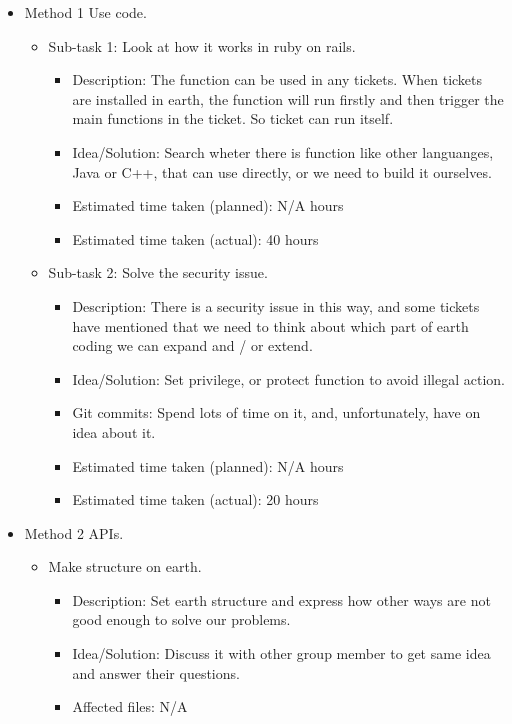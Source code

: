 \begin{itemize}
	\item Method 1 Use code.
	     \begin{itemize}
	        \item Sub-task 1: Look at how it works in ruby on rails.
	           \begin{itemize}
					\item Description: The function can be used in any tickets. When tickets are installed in earth, the function will run firstly and then trigger the main functions in the ticket. So ticket can run itself.
					\item Idea/Solution: Search wheter there is function like other languanges, Java or C++, that can use directly, or we need to build it ourselves. 
					\item Estimated time taken (planned): N/A hours
					\item Estimated time taken (actual): 40 hours
				\end{itemize}
			\item Sub-task 2: Solve the security issue.
			   \begin{itemize}
					\item Description: There is a security issue in this way, and some tickets have mentioned that we need to think about which part of earth coding we can expand and / or extend. 
					\item Idea/Solution: Set privilege, or protect function to avoid illegal action.
					\item Git commits: Spend lots of time on it, and, unfortunately, have on idea about it.
					\item Estimated time taken (planned): N/A hours
					\item Estimated time taken (actual): 20 hours
				\end{itemize}
	     \end{itemize}
	\item Method 2 APIs.
	     \begin{itemize}
	         \item Make structure on earth.
	            \begin{itemize}
	              \item Description: Set earth structure and express how other ways are not good enough to solve our problems. 
					\item Idea/Solution: Discuss it with other group member to get same idea and answer their questions.
					\item Affected files: N/A

\end{itemize}
\end{itemize}
\end{itemize}
